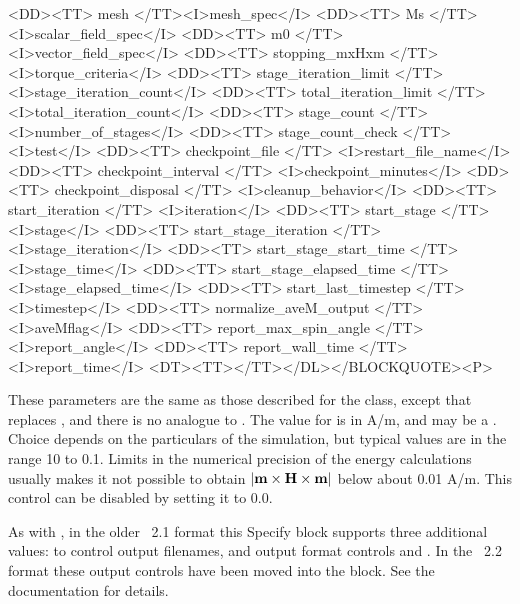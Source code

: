 \begin{description}
\begin{rawhtml}
{<DD><TT> mesh </TT><I>mesh_spec</I>
<DD><TT> Ms </TT> <I>scalar_field_spec</I>
<DD><TT> m0 </TT> <I>vector_field_spec</I>
<DD><TT> stopping_mxHxm </TT><I>torque_criteria</I>
<DD><TT> stage_iteration_limit </TT><I>stage_iteration_count</I>
<DD><TT> total_iteration_limit </TT><I>total_iteration_count</I>
<DD><TT> stage_count </TT><I>number_of_stages</I>
<DD><TT> stage_count_check </TT><I>test</I>
<DD><TT> checkpoint_file </TT> <I>restart_file_name</I>
<DD><TT> checkpoint_interval </TT> <I>checkpoint_minutes</I>
<DD><TT> checkpoint_disposal </TT> <I>cleanup_behavior</I>
<DD><TT> start_iteration </TT> <I>iteration</I>
<DD><TT> start_stage </TT> <I>stage</I>
<DD><TT> start_stage_iteration </TT> <I>stage_iteration</I>
<DD><TT> start_stage_start_time </TT> <I>stage_time</I>
<DD><TT> start_stage_elapsed_time </TT> <I>stage_elapsed_time</I>
<DD><TT> start_last_timestep </TT> <I>timestep</I>
<DD><TT> normalize_aveM_output </TT> <I>aveMflag</I>
<DD><TT> report_max_spin_angle </TT> <I>report_angle</I>
<DD><TT> report_wall_time </TT> <I>report_time</I>
<DT><TT>}</TT></DL></BLOCKQUOTE><P>
\end{rawhtml}
These parameters are the same as those described for the
class, except that
 replaces , and there is no
analogue to .  The value for  is
in A/m, and may be a
.
Choice depends on the particulars of the simulation, but typical values
are in the range 10 to 0.1.  Limits in the numerical precision of the
energy calculations usually makes it not possible to obtain
$|\textbf{m}\times\textbf{H}\times\textbf{m}|$ below about 0.01 A/m.  This control can be
disabled by setting it to 0.0.

As with , in the older \MIF~2.1 format this Specify
block supports three additional values:  to control
output filenames, and output format controls
 and
.  In the \MIF~2.2 format these
output controls have been moved into the  block.
See the 
documentation for details.


\end{description}
